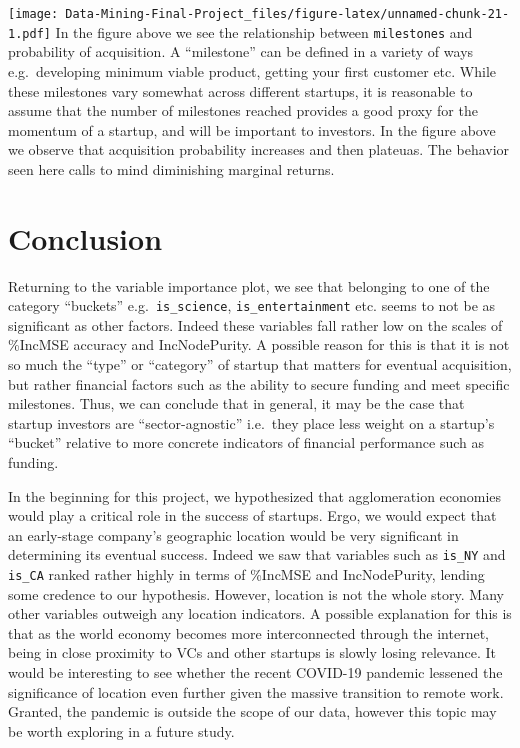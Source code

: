 \documentclass[
]{article}
\begin{document}
\texttt{[image: Data-Mining-Final-Project\_files/figure-latex/unnamed-chunk-21-1.pdf]}
In the figure above we see the relationship between \texttt{milestones}
and probability of acquisition. A ``milestone'' can be defined in a
variety of ways e.g.~developing minimum viable product, getting your
first customer etc. While these milestones vary somewhat across
different startups, it is reasonable to assume that the number of
milestones reached provides a good proxy for the momentum of a startup,
and will be important to investors. In the figure above we observe that
acquisition probability increases and then plateuas. The behavior seen
here calls to mind diminishing marginal returns.

\hypertarget{conclusion}{%
\section{Conclusion}\label{conclusion}}

Returning to the variable importance plot, we see that belonging to one
of the category ``buckets'' e.g.~\texttt{is\_science},
\texttt{is\_entertainment} etc. seems to not be as significant as other
factors. Indeed these variables fall rather low on the scales of
\%IncMSE accuracy and IncNodePurity. A possible reason for this is that
it is not so much the ``type'' or ``category'' of startup that matters
for eventual acquisition, but rather financial factors such as the
ability to secure funding and meet specific milestones. Thus, we can
conclude that in general, it may be the case that startup investors are
``sector-agnostic'' i.e.~they place less weight on a startup's
``bucket'' relative to more concrete indicators of financial performance
such as funding.

In the beginning for this project, we hypothesized that agglomeration
economies would play a critical role in the success of startups. Ergo,
we would expect that an early-stage company's geographic location would
be very significant in determining its eventual success. Indeed we saw
that variables such as \texttt{is\_NY} and \texttt{is\_CA} ranked rather
highly in terms of \%IncMSE and IncNodePurity, lending some credence to
our hypothesis. However, location is not the whole story. Many other
variables outweigh any location indicators. A possible explanation for
this is that as the world economy becomes more interconnected through
the internet, being in close proximity to VCs and other startups is
slowly losing relevance. It would be interesting to see whether the
recent COVID-19 pandemic lessened the significance of location even
further given the massive transition to remote work. Granted, the
pandemic is outside the scope of our data, however this topic may be
worth exploring in a future study.
\end{document}
